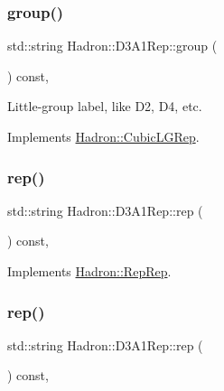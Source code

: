 \subsubsection{\texorpdfstring{group()}{group()}\hspace{0.1cm}{\footnotesize\ttfamily [3/3]}}
{\footnotesize\ttfamily std\+::string Hadron\+::\+D3\+A1\+Rep\+::group (\begin{DoxyParamCaption}{ }\end{DoxyParamCaption}) const\hspace{0.3cm}{\ttfamily [inline]}, {\ttfamily [virtual]}}

Little-\/group label, like D2, D4, etc. 

Implements \mbox{\hyperlink{structHadron_1_1CubicLGRep_a9bdb14b519a611d21379ed96a3a9eb41}{Hadron\+::\+Cubic\+L\+G\+Rep}}.

\mbox{\label{structHadron_1_1D3A1Rep_aa6bbeffd53b5c6efd58e5269da0779b2}} 
\subsubsection{\texorpdfstring{rep()}{rep()}\hspace{0.1cm}{\footnotesize\ttfamily [1/3]}}
{\footnotesize\ttfamily std\+::string Hadron\+::\+D3\+A1\+Rep\+::rep (\begin{DoxyParamCaption}{ }\end{DoxyParamCaption}) const\hspace{0.3cm}{\ttfamily [inline]}, {\ttfamily [virtual]}}



Implements \mbox{\hyperlink{structHadron_1_1RepRep_ab3213025f6de249f7095892109575fde}{Hadron\+::\+Rep\+Rep}}.

\mbox{\label{structHadron_1_1D3A1Rep_aa6bbeffd53b5c6efd58e5269da0779b2}} 
\subsubsection{\texorpdfstring{rep()}{rep()}\hspace{0.1cm}{\footnotesize\ttfamily [2/3]}}
{\footnotesize\ttfamily std\+::string Hadron\+::\+D3\+A1\+Rep\+::rep (\begin{DoxyParamCaption}{ }\end{DoxyParamCaption}) const\hspace{0.3cm}{\ttfamily [inline]}, {\ttfamily [virtual]}}



